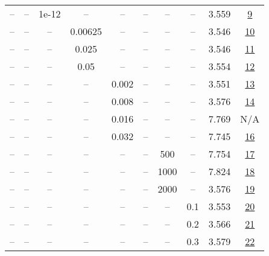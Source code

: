 \begin{table}[H]
\begin{tabular}{cccccccccc}
-- & -- & 1e-12 & -- & -- & -- & -- & -- & 3.559 & \href{https://wandb.ai/stanford-mercury/optimizer-scaling/runs/sweep-130m-2B-sophiaga7912flr0.004-wd0-minlr0-warmup4000-b10.95--7bc0d4}{9} \\
-- & -- & -- & 0.00625 & -- & -- & -- & -- & 3.546 & \href{https://wandb.ai/stanford-mercury/optimizer-scaling/runs/sweep-130m-2B-sophiag18e1e9lr0.004-wd0-minlr0-warmup4000-b10.95--77a1bd}{10} \\
-- & -- & -- & 0.025 & -- & -- & -- & -- & 3.546 & \href{https://wandb.ai/stanford-mercury/optimizer-scaling/runs/sweep-130m-2B-sophiage3d265lr0.004-wd0-minlr0-warmup4000-b10.95--b49616}{11} \\
-- & -- & -- & 0.05 & -- & -- & -- & -- & 3.554 & \href{https://wandb.ai/stanford-mercury/optimizer-scaling/runs/sweep-130m-2B-sophiag7b8220lr0.004-wd0-minlr0-warmup4000-b10.95--bcaa86}{12} \\
-- & -- & -- & -- & 0.002 & -- & -- & -- & 3.551 & \href{https://wandb.ai/stanford-mercury/optimizer-scaling/runs/sweep-130m-2B-sophiau26b00blr0.002-wd0-minlr0-warmup4000-b10.95--5fe952}{13} \\
-- & -- & -- & -- & 0.008 & -- & -- & -- & 3.576 & \href{https://wandb.ai/stanford-mercury/optimizer-scaling/runs/sweep-130m-2B-sophiag89efe6lr0.008-wd0-minlr0-warmup4000-b10.95--0cd475}{14} \\
-- & -- & -- & -- & 0.016 & -- & -- & -- & 7.769 & N/A \\
-- & -- & -- & -- & 0.032 & -- & -- & -- & 7.745 & \href{https://wandb.ai/stanford-mercury/optimizer-scaling/runs/sweep-130m-2B-sophiag4429a5lr0.032-wd0-minlr0-warmup4000-b10.95--7aca97}{16} \\
-- & -- & -- & -- & -- & -- & 500 & -- & 7.754 & \href{https://wandb.ai/stanford-mercury/optimizer-scaling/runs/sweep-130m-2B-sophiagaa0223lr0.004-wd0-minlr0-warmup500-b10.95-b-4192ac}{17} \\
-- & -- & -- & -- & -- & -- & 1000 & -- & 7.824 & \href{https://wandb.ai/stanford-mercury/optimizer-scaling/runs/sweep-130m-2B-sophiaub0f459lr0.004-wd0-minlr0-warmup1000-b10.95--b2eac4}{18} \\
-- & -- & -- & -- & -- & -- & 2000 & -- & 3.576 & \href{https://wandb.ai/stanford-mercury/optimizer-scaling/runs/sweep-130m-2B-sophiau5e660clr0.004-wd0-minlr0-warmup2000-b10.95--2ad339}{19} \\
-- & -- & -- & -- & -- & -- & -- & 0.1 & 3.553 & \href{https://wandb.ai/stanford-mercury/optimizer-scaling/runs/sweep-130m-2B-sophiagb3dd57lr0.004-wd0.1-minlr0-warmup4000-b10.9-e0cbb7}{20} \\
-- & -- & -- & -- & -- & -- & -- & 0.2 & 3.566 & \href{https://wandb.ai/stanford-mercury/optimizer-scaling/runs/sweep-130m-2B-sophiag262a51lr0.004-wd0.2-minlr0-warmup4000-b10.9-508c87}{21} \\
-- & -- & -- & -- & -- & -- & -- & 0.3 & 3.579 & \href{https://wandb.ai/stanford-mercury/optimizer-scaling/runs/sweep-130m-2B-sophiag140385lr0.004-wd0.3-minlr0-warmup4000-b10.9-843326}{22} \\
\bottomrule
\end{tabular}
\end{table}

